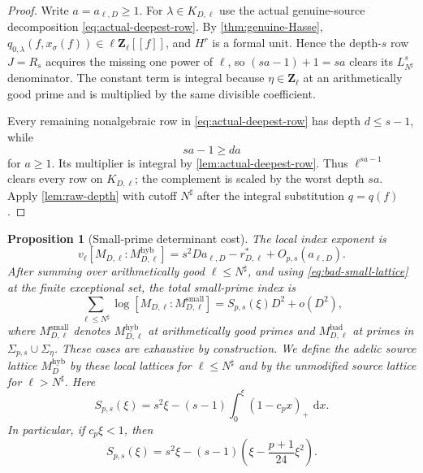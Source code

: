 \documentclass[11pt]{article}
\newtheorem{proposition}[proposition]{Proposition}
\theoremstyle{definition}
\theoremstyle{remark}
\newcommand{\Z}{\mathbf Z}
\newcommand{\dd}{\,\mathrm d}
\begin{document}
\begin{proof}
Write $a=a_{\ell,D}\ge1$.  For $\lambda\in K_{D,\ell}$ use the actual
genuine-source decomposition \eqref{eq:actual-deepest-row}.  By
\cref{thm:genuine-Hasse},
$q_{0,\lambda}(f,x_\sigma(f))\in\ell\Z_\ell[[f]]$, and $H^r$ is a formal
unit.  Hence the depth-$s$ row $J=R_s$ acquires the missing one power of
$\ell$, so $(sa-1)+1=sa$ clears its $L_{N^\sharp}^s$ denominator.  The constant term is
integral because $\eta\in\Z_\ell$ at an arithmetically good prime and is
multiplied by the same divisible coefficient.

Every remaining nonalgebraic row in \eqref{eq:actual-deepest-row} has depth
$d\le s-1$, while
\[
 sa-1\ge da
\]
for $a\ge1$.  Its multiplier is integral by
\cref{lem:actual-deepest-row}.  Thus $\ell^{sa-1}$ clears every row on
$K_{D,\ell}$; the complement is scaled by the worst depth $sa$.  Apply
\cref{lem:raw-depth} with cutoff $N^\sharp$ after the integral
substitution $q=q(f)$.
\end{proof}

\begin{proposition}[Small-prime determinant cost]\label{prop:small-cost}
The local index exponent is
\begin{equation}\label{eq:local-index}
 v_\ell[M_{D,\ell}:M^{\mathrm{hyb}}_{D,\ell}]
 =s^2Da_{\ell,D}-r^*_{D,\ell}+O_{p,s}(a_{\ell,D}).
\end{equation}
After summing over arithmetically good $\ell\le N^\sharp$, and using
\eqref{eq:bad-small-lattice} at the finite exceptional set, the total
small-prime index is
\begin{equation}\label{eq:small-cost}
 \sum_{\ell\le N^\sharp}
 \log[M_{D,\ell}:M^{\mathrm{small}}_{D,\ell}]
 =S_{p,s}(\xi)D^2+o(D^2),
\end{equation}
where $M^{\mathrm{small}}_{D,\ell}$ denotes
$M^{\mathrm{hyb}}_{D,\ell}$ at arithmetically good primes and
$M^{\mathrm{bad}}_{D,\ell}$ at primes in
$\Sigma_{p,s}\cup\Sigma_\eta$.  These cases are exhaustive by construction.
We define the adelic source lattice
$M_D^{\mathrm{hyb}}$ by these local lattices for $\ell\le N^\sharp$ and by the
unmodified source lattice for $\ell>N^\sharp$.  Here
\[
 S_{p,s}(\xi)=s^2\xi-(s-1)
 \int_0^\xi(1-c_px)_+\,\dd x.
\]
In particular, if $c_p\xi<1$, then
\begin{equation}\label{eq:small-cost-simple}
 S_{p,s}(\xi)=s^2\xi-(s-1)
 \left(\xi-\frac{p+1}{24}\xi^2\right).
\end{equation}
\end{proposition}
\end{document}
